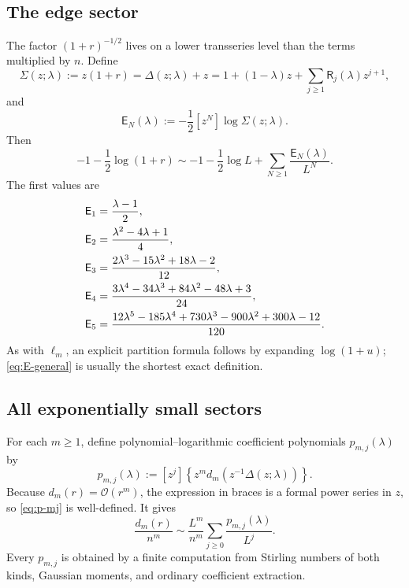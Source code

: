 \documentclass[11pt,a4paper]{article}
\theoremstyle{definition}
\theoremstyle{remark}
\newcommand{\BigO}{\mathcal O}
\newcommand{\coef}[2]{[#1^{#2}]}
\newcommand{\cR}{\mathsf R}
\newcommand{\cE}{\mathsf E}
\begin{document}
\subsection{The edge sector}

The factor \((1+r)^{-1/2}\) lives on a lower transseries level than the terms
multiplied by \(n\).  Define
\begin{equation}\label{eq:Sigmaformal}
 \Sigma(z;\lambda)
 :=z(1+r)=\Delta(z;\lambda)+z
 =1+(1-\lambda)z+\sum_{j\ge1}\cR_j(\lambda)z^{j+1},
\end{equation}
and
\begin{equation}\label{eq:E-general}
 \boxed{
 \cE_N(\lambda):=-\frac12\coef{z}{N}\log\Sigma(z;\lambda).}
\end{equation}
Then
\begin{equation}\label{eq:edge-general}
 -1-\frac12\log(1+r)
 \sim -1-\frac12\log L+
       \sum_{N\ge1}\frac{\cE_N(\lambda)}{L^N}.
\end{equation}
The first values are
\begin{align}
 \cE_1&=\frac{\lambda-1}{2},\notag\\
 \cE_2&=\frac{\lambda^2-4\lambda+1}{4},\notag\\
 \cE_3&=\frac{2\lambda^3-15\lambda^2+18\lambda-2}{12},
 \label{eq:E-first}\\
 \cE_4&=\frac{3\lambda^4-34\lambda^3+84\lambda^2-48\lambda+3}{24},\notag\\
 \cE_5&=\frac{12\lambda^5-185\lambda^4+730\lambda^3-900\lambda^2
                    +300\lambda-12}{120}.\notag
\end{align}
As with \(\ell_m\), an explicit partition formula follows by expanding
\(\log(1+u)\); \cref{eq:E-general} is usually the shortest exact definition.

\subsection{All exponentially small sectors}

For each \(m\ge1\), define polynomial--logarithmic coefficient polynomials
\(p_{m,j}(\lambda)\) by
\begin{equation}\label{eq:p-mj}
 \boxed{
 p_{m,j}(\lambda):=
 \coef{z}{j}
 \left\{
 z^m d_m\!\left(z^{-1}\Delta(z;\lambda)\right)
 \right\}.}
\end{equation}
Because \(d_m(r)=\BigO(r^m)\), the expression in braces is a formal power
series in \(z\), so \cref{eq:p-mj} is well-defined.  It gives
\begin{equation}\label{eq:dm-polylog-sector}
 \frac{d_m(r)}{n^m}
 \sim \frac{L^m}{n^m}
       \sum_{j\ge0}\frac{p_{m,j}(\lambda)}{L^j}.
\end{equation}
Every \(p_{m,j}\) is obtained by a finite computation from Stirling numbers of
both kinds, Gaussian moments, and ordinary coefficient extraction.
\end{document}
